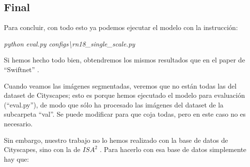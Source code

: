 \subsection{Final}

Para concluir, con todo esto ya podemos ejecutar el modelo con la instrucción:

\begin{center}
\textit{python eval.py configs\textbackslash{rn18\_single\_scale.py}}
\end{center}

Si hemos hecho todo bien, obtendremos los mismos resultados que en el paper de ``Swiftnet'' \cite{swiftnet}.

Cuando veamos las imágenes segmentadas, veremos que no están todas las del dataset de Cityscapes; esto es porque hemos ejecutado el modelo para evaluación (``eval.py''), de modo que sólo ha procesado las imágenes del dataset de la subcarpeta ``val''. Se puede modificar para que coja todas, pero en este caso no es necesario.

Sin embargo, nuestro trabajo no lo hemos realizado con la base de datos de Cityscapes, sino con la de $ISA^{2}$ \cite{isa2}. Para hacerlo con esa base de datos simplemente hay que:

